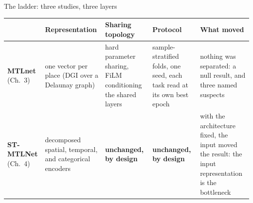 \documentclass{beamer}
\begin{document}
\begin{frame}{The ladder: three studies, three layers}
    \vfill
    {\centering
    \scriptsize
    \setlength{\tabcolsep}{3pt}
    \renewcommand{\arraystretch}{1.2}\begin{tabular}{@{}p{1.60cm} p{2.75cm} p{2.55cm} p{2.90cm} p{3.10cm}@{}}
        \toprule
         & {\raggedright\textbf{Representation}\par} & {\raggedright\textbf{Sharing topology}\par} & {\raggedright\textbf{Protocol}\par} & {\raggedright\textbf{What moved}\par} \\
        \midrule
        {\raggedright \textbf{MTLnet} (Ch.~3)\par}
            & {\raggedright one vector per place (DGI over a Delaunay graph)\par}
            & {\raggedright hard parameter sharing, FiLM conditioning the shared layers\par}
            & {\raggedright sample-stratified folds, one seed, each task read at its own best epoch\par}
            & {\raggedright nothing was separated: a null result, and three named suspects\par} \\
        \addlinespace
        {\raggedright \textbf{ST-MTLNet} (Ch.~4)\par}
            & {\raggedright decomposed spatial, temporal, and categorical encoders\par}
            & {\raggedright\alert{\textbf{unchanged, by design}}\par}
            & {\raggedright\alert{\textbf{unchanged, by design}}\par}
            & {\raggedright with the architecture fixed, the input moved the result: the input representation is the bottleneck\par} \\

\end{tabular}}
\end{frame}
\end{document}
